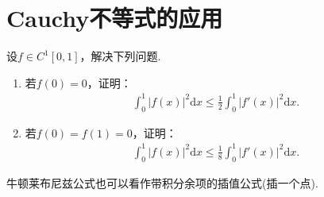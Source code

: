 \documentclass[../../main.tex]{subfiles}
\begin{document}
\section{Cauchy不等式的应用}

\begin{example}
设\(f \in C^1[0, 1]\)，解决下列问题.
\begin{enumerate}
\item 若\(f(0) = 0\)，证明：
\begin{align*}
\int_{0}^{1}|f(x)|^{2}\mathrm{d}x \leqslant \frac{1}{2}\int_{0}^{1}|f'(x)|^{2}\mathrm{d}x.
\end{align*}

\item 若\(f(0) = f(1) = 0\)，证明：
\begin{align*}
\int_{0}^{1}|f(x)|^{2}\mathrm{d}x \leqslant \frac{1}{8}\int_{0}^{1}|f'(x)|^{2}\mathrm{d}x.
\end{align*}
\end{enumerate}
\end{example}
\begin{remark}
牛顿莱布尼兹公式也可以看作带积分余项的插值公式(插一个点).
\end{remark}
\end{document}
